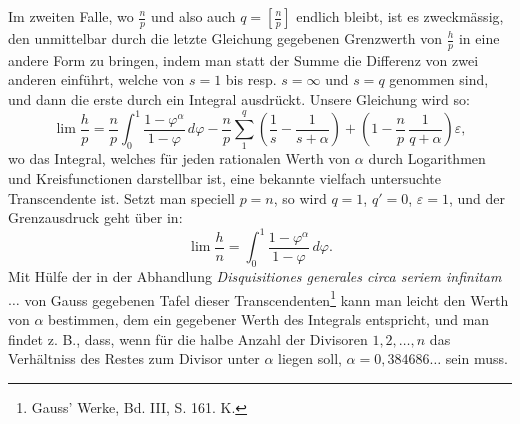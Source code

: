 \documentclass[11pt]{article}
\newcommand{\floor}[1]{\left[#1\right]}
\begin{document}
Im zweiten Falle, wo $\frac np$ und also auch $q=\floor{\frac np}$ endlich bleibt, ist es zweckmässig, den unmittelbar durch die letzte Gleichung gegebenen Grenzwerth von $\frac hp$ in eine andere Form zu bringen, indem man statt der Summe die Differenz von zwei anderen einführt, welche von $s=1$ bis resp. $s=\infty$ und $s=q$ genommen sind, und dann die erste durch ein Integral ausdrückt. Unsere Gleichung wird so:
\[
 \lim\frac hp=\frac np\int_0^1\frac{1-\varphi^\alpha}{1-\varphi}\,d\varphi
 -\frac np\sum_1^q\left(\frac1s-\frac1{s+\alpha}\right)
 +\left(1-\frac np\,\frac1{q+\alpha}\right)\varepsilon,
\]
wo das Integral, welches für jeden rationalen Werth von $\alpha$ durch Logarithmen und Kreisfunctionen darstellbar ist, eine bekannte vielfach untersuchte Transcendente ist. Setzt man speciell $p=n$, so wird $q=1$, $q'=0$, $\varepsilon=1$, und der Grenzausdruck geht über in:
\[
 \lim\frac hn=\int_0^1\frac{1-\varphi^\alpha}{1-\varphi}\,d\varphi.
\]
Mit Hülfe der in der Abhandlung \emph{Disquisitiones generales circa seriem infinitam} $\ldots$ von Gauss gegebenen Tafel dieser Transcendenten\footnote{Gauss' Werke, Bd. III, S. 161. K.} kann man leicht den Werth von $\alpha$ bestimmen, dem ein gegebener Werth des Integrals entspricht, und man findet z. B., dass, wenn für die halbe Anzahl der Divisoren $1,2,\ldots,n$ das Verhältniss des Restes zum Divisor unter $\alpha$ liegen soll, $\alpha=0{,}384686\ldots$ sein muss.
\end{document}
